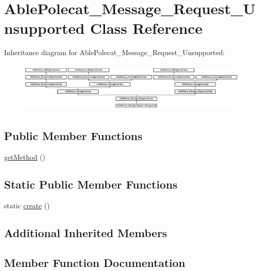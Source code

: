 \hypertarget{class_able_polecat___message___request___unsupported}{}\section{Able\+Polecat\+\_\+\+Message\+\_\+\+Request\+\_\+\+Unsupported Class Reference}
\label{class_able_polecat___message___request___unsupported}
Inheritance diagram for Able\+Polecat\+\_\+\+Message\+\_\+\+Request\+\_\+\+Unsupported\+:\begin{figure}[H]
\begin{center}
\leavevmode
\includegraphics[height=2.443636cm]{class_able_polecat___message___request___unsupported}
\end{center}
\end{figure}
\subsection*{Public Member Functions}
\begin{DoxyCompactItemize}
\item 
\hyperlink{class_able_polecat___message___request___unsupported_af3e37e1a6ed9b8c87f86f659873a83b7}{get\+Method} ()
\end{DoxyCompactItemize}
\subsection*{Static Public Member Functions}
\begin{DoxyCompactItemize}
\item 
static \hyperlink{class_able_polecat___message___request___unsupported_a239b1c70258014a86569483c2d009de6}{create} ()
\end{DoxyCompactItemize}
\subsection*{Additional Inherited Members}


\subsection{Member Function Documentation}
\hypertarget{class_able_polecat___message___request___unsupported_a239b1c70258014a86569483c2d009de6}{}
